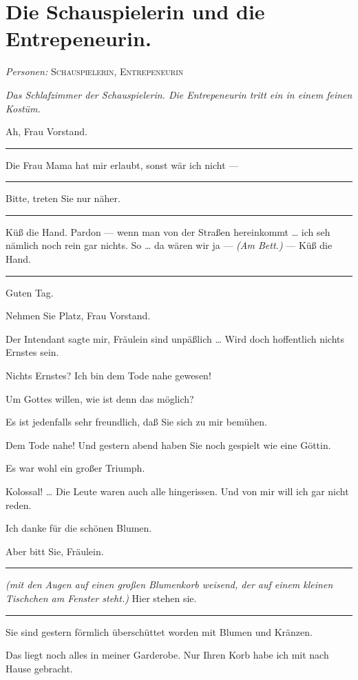 \documentclass[
	final,
	a4paper,
	ngerman,
	mpinclude = true, %
	twoside = true,
	open = right,
	cleardoublepage = plain,
	DIV = 13,
	BCOR = 1cm,
	titlepage = firstiscover,
	]{scrbook}
\newcommand{\scene}{\section}
\newcommand{\direction}[1]{\textit{(#1)}}
\newcommand{\setting}[1]{\vspace{-0.5\baselineskip}\centering\textit{#1}}
\newenvironment{deletion}{%
		\vspace{0.25\baselineskip}
		\hrule
		\vspace{0.25\baselineskip}
		\color{darkgray}
	}{
		\color{black}
		\vspace{0.25\baselineskip}
		\hrule 
		\vspace{0.25\baselineskip}
	}
\newcommand{\characterlist}[1]{{\begin{center}\textit{Personen:} #1\end{center}}}
\newcommand{\thecharacter}[1]{\textup{\textsc{#1}}\xspace}
\newcommand{\theschauspielerin}{\thecharacter{Schauspielerin}}
\newcommand{\thegraf}{\thecharacter{Entrepeneurin}}
\newcommand{\character}[1]{\item[#1:]}
\newcommand{\schauspielerin}{\character{\theschauspielerin}}
\newcommand{\entrepeneurin}{\character{\thegraf}}
\begin{document}
\scene{Die Schauspielerin und die Entrepeneurin.}
\characterlist{\theschauspielerin, \thegraf}
\setting{Das Schlafzimmer der Schauspielerin. Die Entrepeneurin tritt ein in einem feinen Kostüm.}
\begin{play}
	\schauspielerin
	Ah, Frau Vorstand.
	\begin{deletion}

	\entrepeneurin
	Die Frau Mama hat mir erlaubt, sonst wär ich nicht ---

	\schauspielerin
	\end{deletion}
	Bitte, treten Sie nur näher.

	\entrepeneurin
	\begin{deletion}
	Küß die Hand. Pardon --- wenn man von der Straßen hereinkommt \ldots{} ich seh nämlich noch rein gar nichts. So \ldots{} da wären wir ja --- \direction{Am Bett.} --- Küß die Hand.
	\end{deletion}
	Guten Tag.

	\schauspielerin
	Nehmen Sie Platz, Frau Vorstand.

	\entrepeneurin
	Der Intendant sagte mir, Fräulein sind unpäßlich \ldots{} Wird doch hoffentlich nichts Ernstes sein.

	\schauspielerin
	Nichts Ernstes? Ich bin dem Tode nahe gewesen!

	\entrepeneurin
	Um Gottes willen, wie ist denn das möglich?

	\schauspielerin
	Es ist jedenfalls sehr freundlich, daß Sie sich zu mir bemühen.

	\entrepeneurin
	Dem Tode nahe! Und gestern abend haben Sie noch gespielt wie eine Göttin.

	\schauspielerin
	Es war wohl ein großer Triumph.

	\entrepeneurin
	Kolossal! \ldots{} Die Leute waren auch alle hingerissen. Und von mir will ich gar nicht reden.

	\schauspielerin
	Ich danke für die schönen Blumen.

	\entrepeneurin
	Aber bitt Sie, Fräulein.
	\begin{deletion}

	\schauspielerin
	\direction{mit den Augen auf einen großen Blumenkorb weisend, der auf einem kleinen Tischchen am Fenster steht.} Hier stehen sie.

	\entrepeneurin
	\end{deletion}
	Sie sind gestern förmlich überschüttet worden mit Blumen und Kränzen.

	\schauspielerin
	Das liegt noch alles in meiner Garderobe. Nur Ihren Korb habe ich mit nach Hause gebracht.


\end{play}
\end{document}
